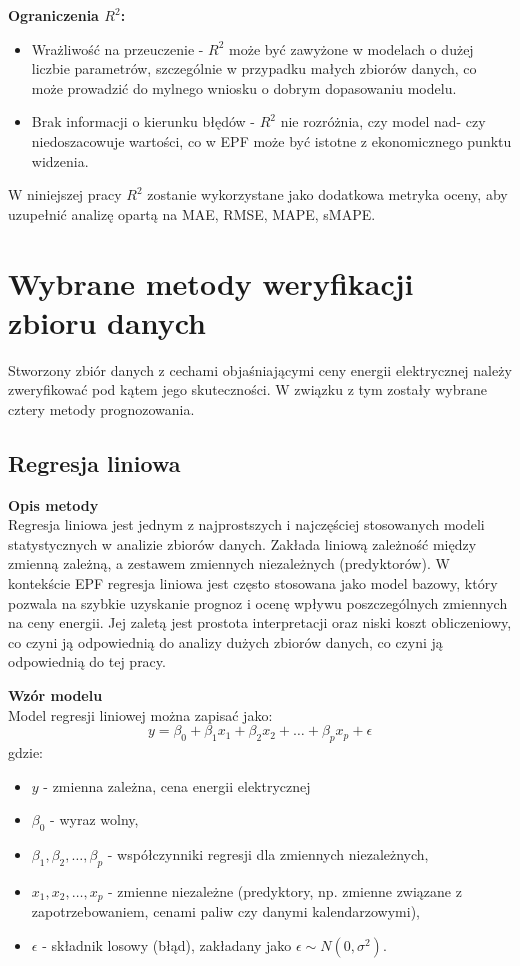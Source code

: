 \textbf{Ograniczenia \( R^2 \):}
\begin{itemize}
    \item Wrażliwość na przeuczenie - \( R^2 \) może być zawyżone w modelach o dużej liczbie parametrów, szczególnie w przypadku małych zbiorów danych, co może prowadzić do mylnego wniosku o dobrym dopasowaniu modelu.
    \item Brak informacji o kierunku błędów - \( R^2 \) nie rozróżnia, czy model nad- czy niedoszacowuje wartości, co w EPF może być istotne z ekonomicznego punktu widzenia.
\end{itemize}

W niniejszej pracy \( R^2 \) zostanie wykorzystane jako dodatkowa metryka oceny, aby uzupełnić analizę opartą na MAE, RMSE, MAPE, sMAPE.

\section{Wybrane metody weryfikacji zbioru danych}
\label{sec:metody_weryfikacji_zbioru_danych}

Stworzony zbiór danych z cechami objaśniającymi ceny energii elektrycznej należy zweryfikować pod kątem jego skuteczności. W związku z tym zostały wybrane cztery metody prognozowania.

\subsection{Regresja liniowa}

\textbf{Opis metody} \\
Regresja liniowa jest jednym z najprostszych i najczęściej stosowanych modeli statystycznych w analizie zbiorów danych. Zakłada liniową zależność między zmienną zależną, a zestawem zmiennych niezależnych (predyktorów). W kontekście EPF regresja liniowa jest często stosowana jako model bazowy, który pozwala na szybkie uzyskanie prognoz i ocenę wpływu poszczególnych zmiennych na ceny energii. Jej zaletą jest prostota interpretacji oraz niski koszt obliczeniowy, co czyni ją odpowiednią do analizy dużych zbiorów danych, co czyni ją odpowiednią do tej pracy.

\textbf{Wzór modelu} \\
Model regresji liniowej można zapisać jako:
\begin{equation}
y = \beta_0 + \beta_1 x_1 + \beta_2 x_2 + \dots + \beta_p x_p + \epsilon
\end{equation}
gdzie:
\begin{itemize}
    \item \( y \) - zmienna zależna, cena energii elektrycznej
    \item \( \beta_0 \) - wyraz wolny,
    \item \( \beta_1, \beta_2, \dots, \beta_p \) - współczynniki regresji dla zmiennych niezależnych,
    \item \( x_1, x_2, \dots, x_p \) - zmienne niezależne (predyktory, np. zmienne związane z zapotrzebowaniem, cenami paliw czy danymi kalendarzowymi),
    \item \( \epsilon \) - składnik losowy (błąd), zakładany jako \( \epsilon \sim N(0, \sigma^2) \).
\end{itemize}

